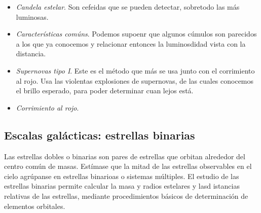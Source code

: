 \begin{itemize} 
    \item \textit{Candela estelar}. Son cefeidas que se pueden detectar, sobretodo las más luminosas.
    \item \textit{Características comúns}. Podemos supoenr que algunos cúmulos son parecidos a los que ya conocemos y relacionar entonces la luminosdidad vista con la distancia.
    \item \textit{Supernovas tipo I}. Este es el método que más se usa junto con el corrimiento al rojo. Usa las violentas explosiones de supernovas, de las cuales conocemos el brillo esperado, para poder determinar cuan lejos está. 
    \item \textit{Corrimiento al rojo}.
\end{itemize}


\subsection{Escalas galácticas: estrellas binarias}

Las estrellas dobles o binarias son pares de estrellas que orbitan alrededor del centro común de masas. Estímase que la mitad de las estrellas observables en el cielo agrúpanse en estrellas binarioas o sistemas múltiples. El estudio de las estrellas binarias permite calcular la masa y radios estelares y lasd istancias relativas de las estrellas, mediante procedimientos básicos de determinación de elementos orbitales. 

